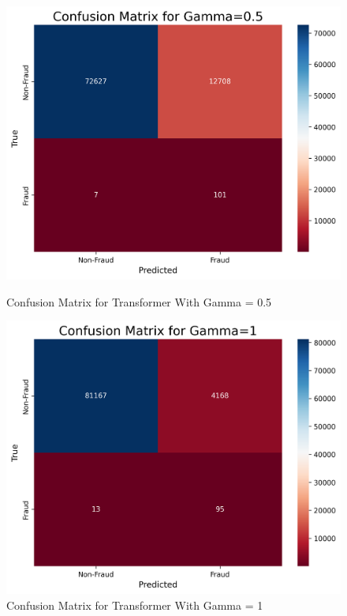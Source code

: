\documentclass[11pt, oneside]{article}   	%
\begin{document}
\begin{figure}[H]
    \centering
    \begin{minipage}{0.49\textwidth}
        \centering
        \includegraphics[width=1.0\textwidth]{images/confusion_matrix_transformer_0.5.png}
        \caption{Confusion Matrix for Transformer With Gamma = 0.5}
        \label{fig:confusion_matrix_transformer_0.5}
    \end{minipage}\hfill
    \begin{minipage}{0.49\textwidth}
        \centering
        \includegraphics[width=1.0\textwidth]{images/confusion_matrix_transformer_1.png}
        \caption{Confusion Matrix for Transformer With Gamma = 1}
        \label{fig:confusion_matrix_transformer_1}
    \end{minipage}
\end{figure}
\end{document}
